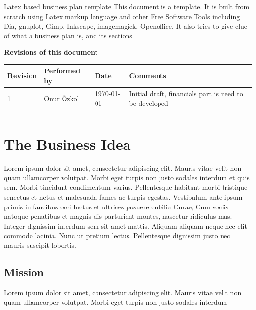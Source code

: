 \documentclass[11pt]{article}
\begin{document}
\begin{center}\huge{Latex based business plan template}\newline
\newline
\newline
\newline
\normalsize
This document is a template. It is built from scratch using Latex 
markup language and other Free Software Tools including Dia, gnuplot, Gimp, 
Inkscape, imagemagick, Openoffice.\newline
It also tries to give clue of what a business plan is, and its sections\newline
\end{center}
\thispagestyle{empty}
\newpage
\tableofcontents
\newpage
\thispagestyle{empty}
\textbf{Revisions of this document}\newline\newline\newline
\begin{tabular}{ | l | l | l | l |}\hline
  Revision & Performed by & Date & Comments \\ \hline
  1 & Onur \"Ozkol & \today & Initial draft, financials part is need to be developed\\ \hline
  & & &  \\ \hline
  & & &  \\ \hline
\end{tabular}

\section{The Business Idea}

Lorem ipsum dolor sit amet, consectetur adipiscing elit. Mauris vitae velit 
non quam ullamcorper volutpat. Morbi eget turpis non justo sodales interdum 
et quis sem. Morbi tincidunt condimentum varius. Pellentesque habitant morbi 
tristique senectus et netus et malesuada fames ac turpis egestas. Vestibulum 
ante ipsum primis in faucibus orci luctus et ultrices posuere cubilia Curae;
Cum sociis natoque penatibus et magnis dis parturient montes, nascetur 
ridiculus mus. Integer dignissim interdum sem sit amet mattis. 
Aliquam aliquam neque nec elit commodo lacinia. Nunc ut pretium lectus. 
Pellentesque dignissim justo nec mauris suscipit lobortis.\newline


\subsection{Mission}
Lorem ipsum dolor sit amet, consectetur adipiscing elit. Mauris vitae velit 
non quam ullamcorper volutpat. Morbi eget turpis non justo sodales interdum
\newline
\end{document}
